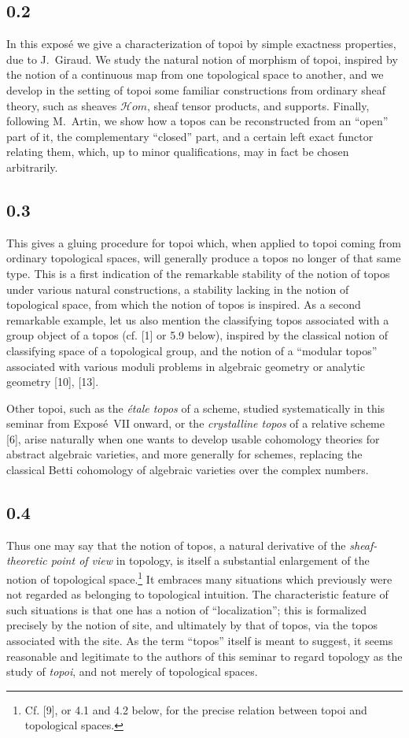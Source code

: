 \documentclass[11pt]{article}
\begin{document}
\subsection*{0.2}
In this expos\'e we give a characterization of topoi by simple exactness properties, due to J.~Giraud. We study the natural notion of morphism of topoi, inspired by the notion of a continuous map from one topological space to another, and we develop in the setting of topoi some familiar constructions from ordinary sheaf theory, such as sheaves \(\mathcal Hom\), sheaf tensor products, and supports. Finally, following M.~Artin, we show how a topos can be reconstructed from an ``open'' part of it, the complementary ``closed'' part, and a certain left exact functor relating them, which, up to minor qualifications, may in fact be chosen arbitrarily.

\subsection*{0.3}
This gives a gluing procedure for topoi which, when applied to topoi coming from ordinary topological spaces, will generally produce a topos no longer of that same type. This is a first indication of the remarkable stability of the notion of topos under various natural constructions, a stability lacking in the notion of topological space, from which the notion of topos is inspired. As a second remarkable example, let us also mention the classifying topos associated with a group object of a topos (cf. [1] or 5.9 below), inspired by the classical notion of classifying space of a topological group, and the notion of a ``modular topos'' associated with various moduli problems in algebraic geometry or analytic geometry [10], [13].

Other topoi, such as the \emph{\'etale topos} of a scheme, studied systematically in this seminar from Expos\'e~VII onward, or the \emph{crystalline topos} of a relative scheme [6], arise naturally when one wants to develop usable cohomology theories for abstract algebraic varieties, and more generally for schemes, replacing the classical Betti cohomology of algebraic varieties over the complex numbers.

\subsection*{0.4}
Thus one may say that the notion of topos, a natural derivative of the \emph{sheaf-theoretic point of view} in topology, is itself a substantial enlargement of the notion of topological space.\footnote{Cf. [9], or 4.1 and 4.2 below, for the precise relation between topoi and topological spaces.} It embraces many situations which previously were not regarded as belonging to topological intuition. The characteristic feature of such situations is that one has a notion of ``localization''; this is formalized precisely by the notion of site, and ultimately by that of topos, via the topos associated with the site. As the term ``topos'' itself is meant to suggest, it seems reasonable and legitimate to the authors of this seminar to regard topology as the study of \emph{topoi}, and not merely of topological spaces.
\end{document}
